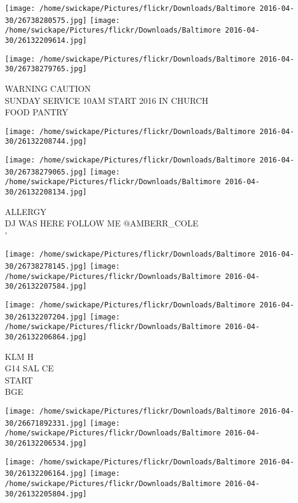 \documentclass[10pt,letterpaper]{article}
\begin{document}
\texttt{[image: /home/swickape/Pictures/flickr/Downloads/Baltimore 2016-04-30/26738280575.jpg]}
\texttt{[image: /home/swickape/Pictures/flickr/Downloads/Baltimore 2016-04-30/26132209614.jpg]}

\texttt{[image: /home/swickape/Pictures/flickr/Downloads/Baltimore 2016-04-30/26738279765.jpg]}

WARNING CAUTION\\
SUNDAY SERVICE 10AM START 2016 IN CHURCH\\
FOOD PANTRY\\
\pagebreak

\texttt{[image: /home/swickape/Pictures/flickr/Downloads/Baltimore 2016-04-30/26132208744.jpg]}

\vspace{0.25in}
\texttt{[image: /home/swickape/Pictures/flickr/Downloads/Baltimore 2016-04-30/26738279065.jpg]}
\texttt{[image: /home/swickape/Pictures/flickr/Downloads/Baltimore 2016-04-30/26132208134.jpg]}

ALLERGY\\
DJ WAS HERE FOLLOW ME @AMBERR\_COLE\\
'\\
\pagebreak

\texttt{[image: /home/swickape/Pictures/flickr/Downloads/Baltimore 2016-04-30/26738278145.jpg]}
\texttt{[image: /home/swickape/Pictures/flickr/Downloads/Baltimore 2016-04-30/26132207584.jpg]}

\texttt{[image: /home/swickape/Pictures/flickr/Downloads/Baltimore 2016-04-30/26132207204.jpg]}
\texttt{[image: /home/swickape/Pictures/flickr/Downloads/Baltimore 2016-04-30/26132206864.jpg]}

KLM H\\
G14 SAL CE\\
START\\
BGE\\
\pagebreak

\texttt{[image: /home/swickape/Pictures/flickr/Downloads/Baltimore 2016-04-30/26671892331.jpg]}
\texttt{[image: /home/swickape/Pictures/flickr/Downloads/Baltimore 2016-04-30/26132206534.jpg]}

\texttt{[image: /home/swickape/Pictures/flickr/Downloads/Baltimore 2016-04-30/26132206164.jpg]}
\texttt{[image: /home/swickape/Pictures/flickr/Downloads/Baltimore 2016-04-30/26132205804.jpg]}
\end{document}
